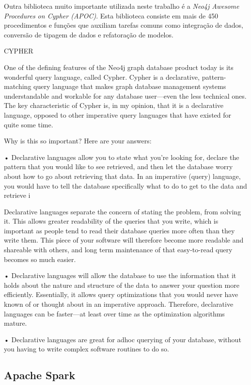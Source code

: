 Outra biblioteca muito importante utilizada neste trabalho é a \emph{Neo4j Awesome Procedures on
Cypher (APOC)}. Esta biblioteca consiste em mais de 450 procedimentos e funções que auxiliam tarefas comuns como integração de dados, conversão de tipagem de dados e refatoração de modelos.


CYPHER

One of the defining features of the Neo4j graph database product today is its
wonderful query language, called Cypher. Cypher is a declarative, pattern-matching
query language that makes graph database management systems understandable and
workable for any database user—even the less technical ones.
The key characteristic of Cypher is, in my opinion, that it is a declarative language,
opposed to other imperative query languages that have existed for quite some time.

Why is this so important? Here are your answers:

•	 Declarative languages allow you to state what you're looking for, declare
the pattern that you would like to see retrieved, and then let the database
worry about how to go about retrieving that data.
In an imperative (query) language, you would have to tell the database
specifically what to do to get to the data and retrieve i


Declarative languages separate the concern of stating the problem, from
solving it. This allows greater readability of the queries that you write,
which is important as people tend to read their database queries more
often than they write them. This piece of your software will therefore
become more readable and shareable with others, and long term
maintenance of that easy-to-read query becomes so much easier.

•	 Declarative languages will allow the database to use the information that
it holds about the nature and structure of the data to answer your question
more efficiently. Essentially, it allows query optimizations that you would
never have known of or thought about in an imperative approach. Therefore,
declarative languages can be faster—at least over time as the optimization
algorithms mature.

•	 Declarative languages are great for adhoc querying of your database,
without you having to write complex software routines to do so.

\subsection{Apache Spark}



